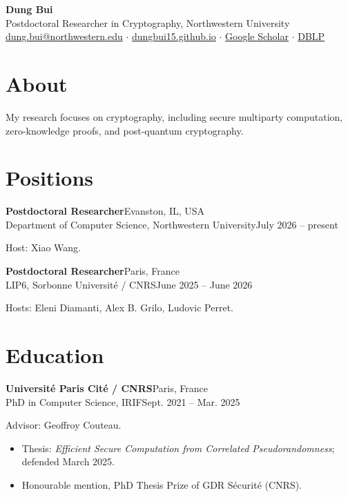 \documentclass[11pt]{article}
\newcommand{\entry}[4]{%
  \needspace{3\baselineskip}%
  \noindent\textbf{#1}\hspace{1em}\hfill #2\\[0.15em]
  \noindent #3\hspace{1em}\hfill #4\par\vspace{0.45em}}
\begin{document}
\begin{center}
      {\LARGE\bfseries Dung Bui}\\[0.5em]
      Postdoctoral Researcher in Cryptography, Northwestern University\\[0.35em]
      \href{mailto:dung.bui@northwestern.edu}{dung.bui@northwestern.edu} \quad$\cdot$\quad
      \href{https://dungbui15.github.io}{dungbui15.github.io} \quad$\cdot$\quad
      \href{https://scholar.google.com/citations?user=StGOHMUAAAAJ}{Google Scholar} \quad$\cdot$\quad
      \href{https://dblp.uni-trier.de/pid/127/1711.html}{DBLP}
\end{center}
\vspace{0.5em}

\section{About}
My research focuses on cryptography, including secure multiparty computation, zero-knowledge proofs, and
post-quantum cryptography.
\section{Positions}

\entry{Postdoctoral Researcher}{Evanston, IL, USA}
{Department of Computer Science, Northwestern University}{July 2026 -- present}
\vspace{-0.45em}
\noindent Host: Xiao Wang.\par\vspace{0.45em}

\entry{Postdoctoral Researcher}{Paris, France}
{LIP6, Sorbonne Universit\'e / CNRS}{June 2025 -- June 2026}
\vspace{-0.45em}
\noindent Hosts: Eleni Diamanti, Alex B. Grilo, Ludovic Perret.\par\vspace{0.45em}

\section{Education}

\entry{Universit\'e Paris Cit\'e / CNRS}{Paris, France}
{PhD in Computer Science, IRIF}{Sept. 2021 -- Mar. 2025}
\vspace{-0.45em}
\noindent Advisor: Geoffroy Couteau.\par\vspace{0.45em}
\vspace{-0.6em}
\begin{itemize}
      \item Thesis: \emph{Efficient Secure Computation from Correlated Pseudorandomness};
            defended March 2025.
      \item Honourable mention, PhD Thesis Prize of GDR S\'ecurit\'e (CNRS).
\end{itemize}
\vspace{0.45em}
\end{document}
